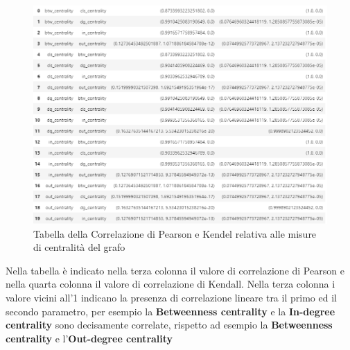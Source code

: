 \documentclass[a4paper,11pt]{report}
\begin{document}
\begin{figure}[ht]
	\centering
	\includegraphics[width=1\linewidth]{tabella}
	\caption[]{Tabella della Correlazione di Pearson e Kendel relativa alle misure di centralità del grafo}
\end{figure}
Nella tabella è indicato nella terza colonna il valore di correlazione di Pearson e nella quarta colonna il valore di correlazione di Kendall.
Nella terza colonna i valore vicini all'1 indicano la presenza di correlazione lineare tra il primo ed il secondo parametro, per esempio la \textbf{Betweenness centrality} e la \textbf{In-degree centrality} sono decisamente correlate, rispetto ad esempio la \textbf{Betweenness centrality} e l'\textbf{Out-degree centrality}
\end{document}
